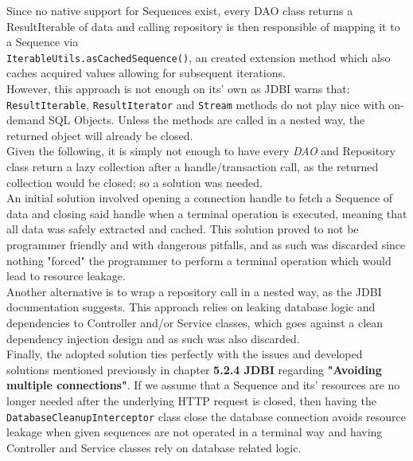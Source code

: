 Since no native support for Sequences exist, every DAO class returns a ResultIterable of data and calling repository is then responsible of mapping it to
a Sequence via\\
\texttt{IterableUtils.asCachedSequence()}, an created extension method which also caches acquired values allowing for subsequent iterations.\\

However, this approach is not enough on its' own as JDBI warns that:\\

\texttt{ResultIterable}, \texttt{ResultIterator} and \texttt{Stream} methods do not play nice with on-demand SQL Objects. Unless the methods are called in a nested way, the
returned object will already be closed.\\

Given the following, it is simply not enough to have every \textit{DAO} and Repository class return a lazy collection after a handle/transaction call,
as the returned collection would be closed; so a solution was needed.\\

An initial solution involved opening a connection handle to fetch a Sequence of data and closing said handle when a terminal operation is executed, meaning that all data was
safely extracted and cached. This solution proved to not be programmer friendly and with dangerous pitfalls, and as such was discarded since nothing "forced" the programmer to
perform a terminal operation which would lead to resource leakage.\\ 

Another alternative is to wrap a repository call in a nested way, as the JDBI documentation suggests. This approach relies on leaking database logic and dependencies to Controller
and/or Service classes, which goes against a clean dependency injection design and as such was also discarded.\\

Finally, the adopted solution ties perfectly with the issues and developed solutions mentioned previously in chapter \textbf{5.2.4 JDBI} regarding \textbf{"Avoiding multiple connections"}.
If we assume that a Sequence and its' resources are no longer needed after the underlying HTTP request is closed, then having the \texttt{DatabaseCleanupInterceptor} class close the
database connection avoids resource leakage when given sequences are not operated in a terminal way and having Controller and Service classes rely on database  related logic.



